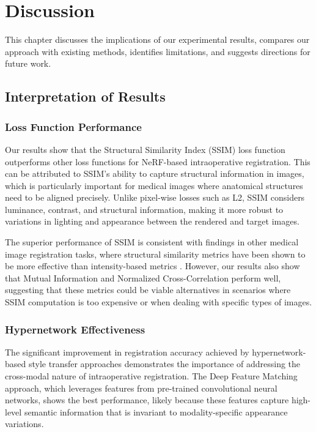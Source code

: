 \chapter{Discussion}

This chapter discusses the implications of our experimental results, compares our approach with existing methods, identifies limitations, and suggests directions for future work.

\section{Interpretation of Results}

\subsection{Loss Function Performance}
Our results show that the Structural Similarity Index (SSIM) loss function outperforms other loss functions for NeRF-based intraoperative registration. This can be attributed to SSIM's ability to capture structural information in images, which is particularly important for medical images where anatomical structures need to be aligned precisely. Unlike pixel-wise losses such as L2, SSIM considers luminance, contrast, and structural information, making it more robust to variations in lighting and appearance between the rendered and target images.

The superior performance of SSIM is consistent with findings in other medical image registration tasks, where structural similarity metrics have been shown to be more effective than intensity-based metrics \cite{wang2004image}. However, our results also show that Mutual Information and Normalized Cross-Correlation perform well, suggesting that these metrics could be viable alternatives in scenarios where SSIM computation is too expensive or when dealing with specific types of images.

\subsection{Hypernetwork Effectiveness}
The significant improvement in registration accuracy achieved by hypernetwork-based style transfer approaches demonstrates the importance of addressing the cross-modal nature of intraoperative registration. The Deep Feature Matching approach, which leverages features from pre-trained convolutional neural networks, shows the best performance, likely because these features capture high-level semantic information that is invariant to modality-specific appearance variations.


